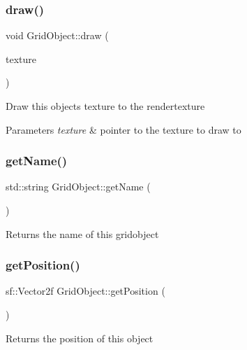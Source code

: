 \subsubsection{\texorpdfstring{draw()}{draw()}\hspace{0.1cm}{\footnotesize\ttfamily [2/2]}}
{\footnotesize\ttfamily void Grid\+Object\+::draw (\begin{DoxyParamCaption}\item[{sf\+::\+Render\+Texture \&}]{texture }\end{DoxyParamCaption})}

Draw this objects texture to the rendertexture


\begin{DoxyParams}{Parameters}
{\em texture} & pointer to the texture to draw to \\
\hline
\end{DoxyParams}
\mbox{\label{classGridObject_afc37d553af0c5d387bbb36c0aeb203f2}} 
\subsubsection{\texorpdfstring{get\+Name()}{getName()}}
{\footnotesize\ttfamily std\+::string Grid\+Object\+::get\+Name (\begin{DoxyParamCaption}{ }\end{DoxyParamCaption})}

\begin{DoxyReturn}{Returns}
the name of this gridobject 
\end{DoxyReturn}
\mbox{\label{classGridObject_a3d59640bb036183f9a0236c16764a2e8}} 
\subsubsection{\texorpdfstring{get\+Position()}{getPosition()}}
{\footnotesize\ttfamily sf\+::\+Vector2f Grid\+Object\+::get\+Position (\begin{DoxyParamCaption}{ }\end{DoxyParamCaption})}

\begin{DoxyReturn}{Returns}
the position of this object 
\end{DoxyReturn}
\mbox{\label{classGridObject_a5198d38a8012f505c058689928cb2fde}} 
